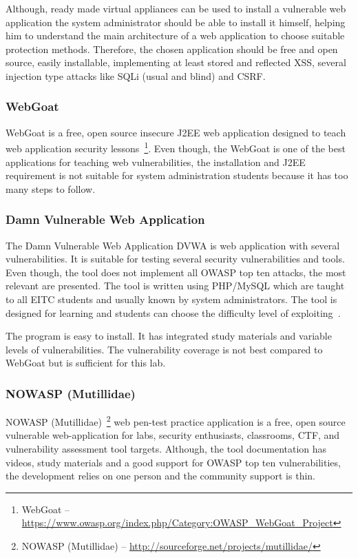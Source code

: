 Although, ready made virtual appliances can be used to install a vulnerable web application the
system administrator should be able to install it himself, helping him to understand the main architecture of a web application to choose suitable protection methods. Therefore, the chosen application should be free and open source, easily installable, implementing  at least stored and reflected \gls{XSS}, several injection type attacks like \gls{SQLi} (usual and blind) and \gls{CSRF}.

\subsubsection{WebGoat}
WebGoat is a free, open source insecure J2EE web application designed to teach web application security lessons~\footnote{WebGoat -- \url{https://www.owasp.org/index.php/Category:OWASP_WebGoat_Project}}.  Even though, the WebGoat is one of the best applications for teaching web vulnerabilities, the installation and J2EE requirement is not suitable for system administration students because it has too many steps to follow.


\subsubsection{Damn Vulnerable Web Application}
The Damn Vulnerable Web Application \gls{DVWA} is web application with several vulnerabilities. It is suitable for testing several security vulnerabilities and tools. Even though, the tool does not implement all \gls{OWASP} top ten attacks, the most relevant are presented. The tool is written using PHP/MySQL which are taught to all \gls{EITC} students and usually known by system administrators. The tool is designed for learning and students can choose the difficulty level of exploiting~\citep{website:dvwa}.

The program is easy to install. It has integrated study materials and variable levels of vulnerabilities.
The vulnerability coverage is not best compared to WebGoat but is sufficient for this lab.

\subsubsection{NOWASP (Mutillidae)}
NOWASP (Mutillidae)~\footnote{NOWASP (Mutillidae) -- \url{http://sourceforge.net/projects/mutillidae/}} web pen-test practice application is a free, open source vulnerable web-application for labs, security enthusiasts, classrooms, \gls{CTF}, and vulnerability assessment tool targets. \citep{website:Mutillidae} Although, the tool documentation has videos, study materials and a good support for \gls{OWASP} top ten vulnerabilities, the development relies on one person and the community support is thin.

